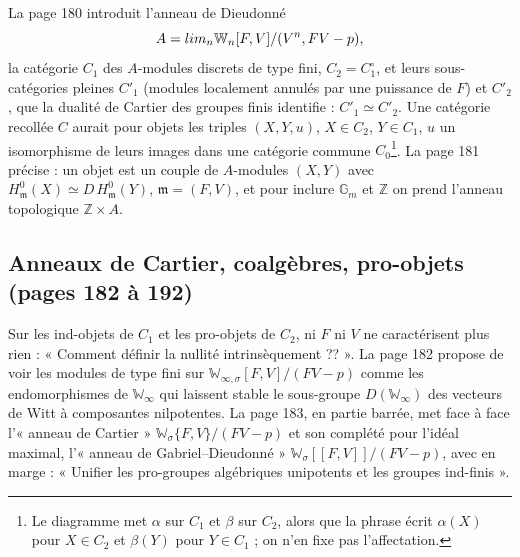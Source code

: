 \documentclass[11pt,a4paper]{article}
\begin{document}
La page 180 introduit l'anneau de Dieudonné
\[
A = \varprojlim_n \mathbb{W}_n[F, V]/(V^n, FV - p),
\]
la catégorie $C_1$ des $A$-modules discrets de type fini, $C_2 = C_1^{\circ}$, et
leurs sous-catégories pleines $C'_1$ (modules localement annulés par une
puissance de $F$) et $C'_2$, que la dualité de Cartier des groupes finis identifie
: $C'_1 \simeq C'_2$. Une catégorie recollée $C$ aurait pour objets les triples
$(X, Y, u)$, $X \in C_2$, $Y \in C_1$, $u$ un isomorphisme de leurs images dans une
catégorie commune $C_0$\footnote{Le diagramme met $\alpha$ sur $C_1$ et $\beta$ sur
$C_2$, alors que la phrase écrit $\alpha(X)$ pour $X \in C_2$ et $\beta(Y)$ pour
$Y \in C_1$ ; on n'en fixe pas l'affectation.}. La page 181 précise : un objet est
un couple de $A$-modules $(X, Y)$ avec $H^0_{\mathfrak{m}}(X) \simeq
D\,H^0_{\mathfrak{m}}(Y)$, $\mathfrak{m} = (F, V)$, et pour inclure $\mathbb{G}_m$ et
$\mathbb{Z}$ on prend l'anneau topologique $\mathbb{Z} \times A$.

\subsection*{Anneaux de Cartier, coalgèbres, pro-objets (pages 182 à 192)}

Sur les ind-objets de $C_1$ et les pro-objets de $C_2$, ni $F$ ni $V$ ne
caractérisent plus rien : « Comment définir la nullité intrinsèquement ?? ». La page
182 propose de voir les modules de type fini sur $\mathbb{W}_{\infty,\sigma}[F,
V]/(FV - p)$ comme les endomorphismes de $\mathbb{W}_\infty$ qui laissent stable le
sous-groupe $D(\mathbb{W}_\infty)$ des vecteurs de Witt à composantes nilpotentes.
La page 183, en partie barrée, met face à face l'« anneau de Cartier »
$\mathbb{W}_\sigma\{F, V\}/(FV - p)$ et son complété pour l'idéal maximal, l'« anneau
de Gabriel–Dieudonné » $\mathbb{W}_\sigma[[F, V]]/(FV - p)$, avec en marge :
« Unifier les pro-groupes algébriques unipotents et les groupes ind-finis ».
\end{document}
